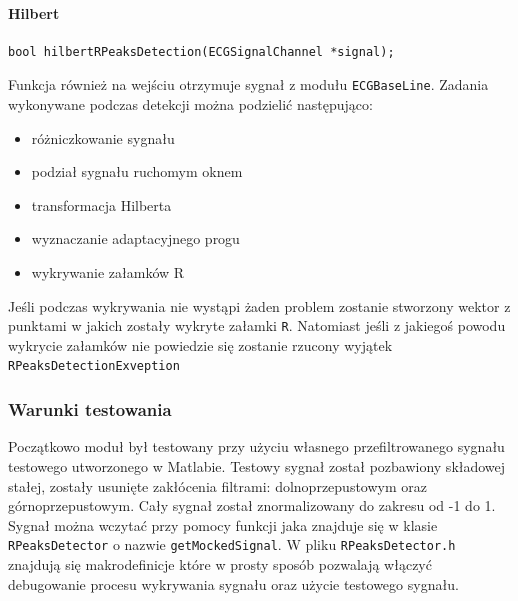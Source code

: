 \documentclass[a4paper, 11pt]{article}
\begin{document}
\paragraph{Hilbert}
\begin{lstlisting}
bool hilbertRPeaksDetection(ECGSignalChannel *signal);
\end{lstlisting}
Funkcja również na wejściu otrzymuje sygnał z modułu \verb|ECGBaseLine|. Zadania wykonywane podczas detekcji można podzielić następująco:
\begin{itemize}
	\item różniczkowanie sygnału
	\item podział sygnału ruchomym oknem
	\item transformacja Hilberta
	\item wyznaczanie adaptacyjnego progu
	\item wykrywanie załamków R
\end{itemize}
Jeśli podczas wykrywania nie wystąpi żaden problem zostanie stworzony wektor z punktami w jakich zostały wykryte załamki \verb|R|. Natomiast jeśli z jakiegoś powodu wykrycie załamków nie powiedzie się zostanie rzucony wyjątek \verb|RPeaksDetectionExveption|

\subsubsection{Warunki testowania}
\label{sec:rs:tests}
Początkowo moduł był testowany przy użyciu własnego przefiltrowanego sygnału testowego utworzonego w Matlabie. Testowy sygnał został pozbawiony składowej stałej, zostały usunięte zakłócenia filtrami: dolnoprzepustowym oraz górnoprzepustowym. Cały sygnał został znormalizowany do zakresu od -1 do 1.\\
\indent Sygnał można wczytać przy pomocy funkcji jaka znajduje się w klasie \verb|RPeaksDetector| o nazwie \verb|getMockedSignal|. W pliku \verb|RPeaksDetector.h| znajdują się makrodefinicje które w prosty sposób pozwalają włączyć debugowanie procesu wykrywania sygnału oraz użycie testowego sygnału.\\
\end{document}
